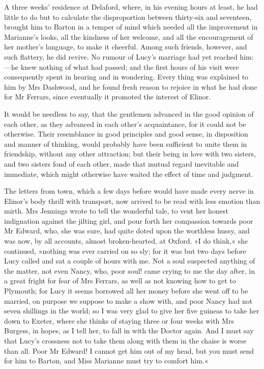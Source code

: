 A three weeks’ residence at Delaford, where, in his evening hours at least, he had little to do but to calculate the disproportion between thirty-six and seventeen, brought him to Barton in a temper of mind which needed all the improvement in Marianne’s looks, all the kindness of her welcome, and all the encouragement of her mother’s language, to make it cheerful. Among such friends, however, and such flattery, he did revive. No rumour of Lucy’s marriage had yet reached him:—he knew nothing of what had passed; and the first hours of his visit were consequently spent in hearing and in wondering. Every thing was explained to him by Mrs Dashwood, and he found fresh reason to rejoice in what he had done for Mr Ferrars, since eventually it promoted the interest of Elinor.

It would be needless to say, that the gentlemen advanced in the good opinion of each other, as they advanced in each other’s acquaintance, for it could not be otherwise. Their resemblance in good principles and good sense, in disposition and manner of thinking, would probably have been sufficient to unite them in friendship, without any other attraction; but their being in love with two sisters, and two sisters fond of each other, made that mutual regard inevitable and immediate, which might otherwise have waited the effect of time and judgment.

The letters from town, which a few days before would have made every nerve in Elinor’s body thrill with transport, now arrived to be read with less emotion than mirth. Mrs Jennings wrote to tell the wonderful tale, to vent her honest indignation against the jilting girl, and pour forth her compassion towards poor Mr Edward, who, she was sure, had quite doted upon the worthless hussy, and was now, by all accounts, almost broken-hearted, at Oxford. »I do think,« she continued, »nothing was ever carried on so sly; for it was but two days before Lucy called and sat a couple of hours with me. Not a soul suspected anything of the matter, not even Nancy, who, poor soul! came crying to me the day after, in a great fright for fear of Mrs Ferrars, as well as not knowing how to get to Plymouth; for Lucy it seems borrowed all her money before she went off to be married, on purpose we suppose to make a show with, and poor Nancy had not seven shillings in the world; so I was very glad to give her five guineas to take her down to Exeter, where she thinks of staying three or four weeks with Mrs Burgess, in hopes, as I tell her, to fall in with the Doctor again. And I must say that Lucy’s crossness not to take them along with them in the chaise is worse than all. Poor Mr Edward! I cannot get him out of my head, but you must send for him to Barton, and Miss Marianne must try to comfort him.«

